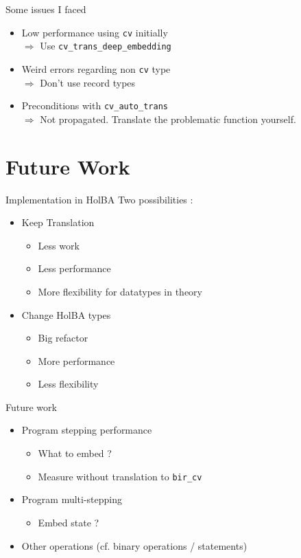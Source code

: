\documentclass{beamer}
\begin{document}
\begin{frame}{Some issues I faced}
  \begin{itemize}
    \item Low performance using \texttt{cv} initially\\
      {$\Rightarrow$ Use \texttt{cv\_trans\_deep\_embedding}}
    \item Weird errors regarding non \texttt{cv} type\\
      {$\Rightarrow$ Don’t use record types}
    \item Preconditions with \texttt{cv\_auto\_trans}\\
      {$\Rightarrow$ Not propagated. Translate the problematic function yourself.}
  \end{itemize}
\end{frame}


\section{Future Work}

\begin{frame}{Implementation in HolBA}
  Two possibilities :
  \begin{itemize}
    \item Keep Translation
    \begin{itemize}
      \item Less work
      \item Less performance
      \item More flexibility for datatypes in theory
    \end{itemize}
    \item Change HolBA types
    \begin{itemize}
      \item Big refactor
      \item More performance
      \item Less flexibility
    \end{itemize}

  \end{itemize}
\end{frame}

\begin{frame}{Future work}
  \begin{itemize}
    \item Program stepping performance
    \begin{itemize}
      \item What to embed ?
      \item Measure without translation to \texttt{bir\_cv}
    \end{itemize}
    \item Program multi-stepping
    \begin{itemize}
      \item Embed state ?
    \end{itemize}
    \item Other operations (cf. binary operations / statements)
  \end{itemize}
\end{frame}
\end{document}
